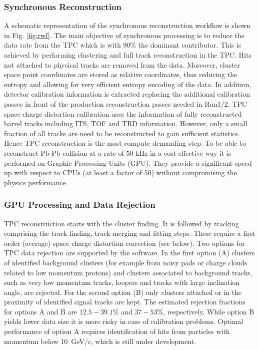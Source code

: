 \begin{figure*}[hbtp]
  \begin{center}
    \vspace*{10cm}
 \end{center}
 \caption{Synchronous Reconstruction Workflow}
 \label{fig:rwf}
 \end{figure*}
\subsubsection{Synchronous Reconstruction}
A schematic representation of the synchronous reconstruction workflow is shown in Fig. \ref{fig:rwf}.
The main objective of synchronous processing is to reduce the data rate from the TPC which is with 90\%
the dominant contributor. This is achieved by performing clustering and full track reconstruction in the
TPC. Hits not attached to physical tracks are removed from the data. Moreover, cluster space point 
coordinates are stored as relative coordinates, thus reducing the entropy and allowing for very efficient entropy
encoding of the data.
In addition, detector calibration information is extracted replacing the additional 
calibration passes in front of the production reconstruction passes needed in Run1/2. TPC space charge 
distortion calibration uses the information of fully reconstructed barrel tracks including ITS, TOF and
TRD information. However, only a small fraction of all tracks are need to be reconstructed to gain 
sufficient statistics. Hence TPC reconstruction is the most compute demanding step. To be able to 
reconstruct Pb-Pb collision at a rate of 50 kHz in a cost 
effective way it is performed on Graphic Processing Units (GPU). They provide a significant speed-up 
with respect to CPUs (at least a factor of 50) without compromising the physics performance.

\subsubsection*{GPU Processing and Data Rejection}
TPC reconstruction starts with the cluster finding. It is followed by tracking comprising the track 
finding, track merging and fitting steps. These require a first order (average) space charge distortion
correction (see below). Two options for TPC data rejection are supported by the software. In the first 
option (A) clusters of identified background clusters (for example from noisy pads or charge clouds 
related to low momentum protons) and clusters associated to background tracks, such as very low momentum tracks, loopers and 
tracks with large inclination angle, are rejected.  For the second option (B) only clusters attached or
in the proximity of identified signal tracks are kept.
The estimated rejection fractions for options A and B are $12.5-39.1\%$ and $37-53\%$, respectively. 
While option B yields lower data size it is more risky in case of calibration problems. Optimal 
performance of option A requires identification of hits from particles with momentum below 10~GeV/$c$, 
which is still under development.

